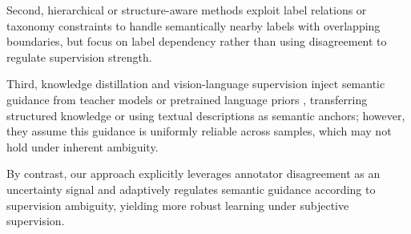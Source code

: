 Second, hierarchical or structure-aware methods exploit label relations or taxonomy constraints \cite{zhang_use_2022, shi_learnable_2023} to handle semantically nearby labels with overlapping boundaries, but focus on label dependency rather than using disagreement to regulate supervision strength.

Third, knowledge distillation and vision-language supervision inject semantic guidance from teacher models or pretrained language priors \cite{touvron_training_2021, radford_learning_2021}, transferring structured knowledge or using textual descriptions as semantic anchors; however, they assume this guidance is uniformly reliable across samples, which may not hold under inherent ambiguity.

By contrast, our approach explicitly leverages annotator disagreement as an uncertainty signal and adaptively regulates semantic guidance according to supervision ambiguity, yielding more robust learning under subjective supervision.
\fi
